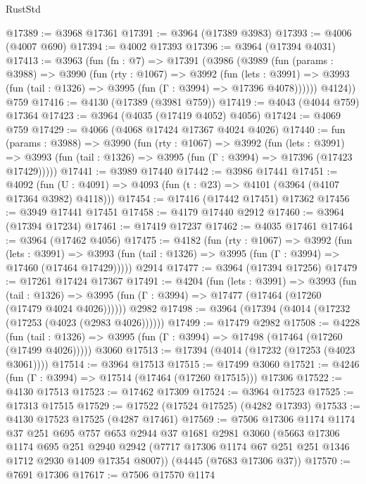 \begin{lexlean}{RustStd}
\begin{coremodule}
@17389 := @3968 @17361
@17391 := @3964 (@17389 @3983)
@17393 := @4006 (@4007 @690)
@17394 := @4002 @17393
@17396 := @3964 (@17394 @4031)
@17413 := @3963
    (fun (fn : @7) =>
    @17391
      (@3986
        (@3989
          (fun (params : @3988) =>
          @3990
            (fun (rty : @1067) =>
            @3992
              (fun (lets : @3991) =>
              @3993 (fun (tail : @1326) => @3995 (fun (Γ : @3994) => @17396 @4078))))))
        @4124))
    @759
@17416 := @4130 (@17389 (@3981 @759))
@17419 := @4043 (@4044 @759) @17364
@17423 := @3964 (@4035 (@17419 @4052) @4056)
@17424 := @4069 @759
@17429 := @4066 (@4068 @17424 @17367 @4024 @4026)
@17440 := fun (params : @3988) =>
  @3990
    (fun (rty : @1067) =>
    @3992
      (fun (lets : @3991) =>
      @3993 (fun (tail : @1326) => @3995 (fun (Γ : @3994) => @17396 (@17423 @17429)))))
@17441 := @3989 @17440
@17442 := @3986 @17441
@17451 := @4092
    (fun (U : @4091) => @4093 (fun (t : @23) => @4101 (@3964 (@4107 @17364 @3982) @4118)))
@17454 := @17416 (@17442 @17451) @17362
@17456 := @3949 @17441 @17451
@17458 := @4179 @17440 @2912
@17460 := @3964 (@17394 @17234)
@17461 := @17419 @17237
@17462 := @4035 @17461
@17464 := @3964 (@17462 @4056)
@17475 := @4182
    (fun (rty : @1067) =>
    @3992
      (fun (lets : @3991) =>
      @3993 (fun (tail : @1326) => @3995 (fun (Γ : @3994) => @17460 (@17464 @17429)))))
    @2914
@17477 := @3964 (@17394 @17256)
@17479 := @17261 @17424 @17367
@17491 := @4204
    (fun (lets : @3991) =>
    @3993
      (fun (tail : @1326) =>
      @3995 (fun (Γ : @3994) => @17477 (@17464 (@17260 (@17479 @4024 @4026))))))
    @2982
@17498 := @3964 (@17394 (@4014 (@17232 (@17253 (@4023 (@2983 @4026))))))
@17499 := @17479 @2982
@17508 := @4228
    (fun (tail : @1326) => @3995 (fun (Γ : @3994) => @17498 (@17464 (@17260 (@17499 @4026)))))
    @3060
@17513 := @17394 (@4014 (@17232 (@17253 (@4023 @3061))))
@17514 := @3964 @17513
@17515 := @17499 @3060
@17521 := @4246 (fun (Γ : @3994) => @17514 (@17464 (@17260 @17515))) @17306
@17522 := @4130 @17513
@17523 := @17462 @17309
@17524 := @3964 @17523
@17525 := @17313 @17515
@17529 := @17522 (@17524 @17525) (@4282 @17393)
@17533 := @4130 @17523 @17525 (@4287 @17461)
@17569 := @7506
    @17306
    @1174
    @1174
    @37
    @251
    @695
    @757
    @653
    @2944
    @37
    @1681
    @2981
    @3060
    (@5663
      @17306
      @1174
      @695
      @251
      @2940
      @2942
      (@7717 @17306 @1174 @67 @251 @251 @1346 @1712 @2930 @1409 @17354 @8007))
    (@4445 (@7683 @17306 @37))
@17570 := @7691 @17306
@17617 := @7506
    @17570
    @1174

\end{coremodule}
\end{lexlean}
